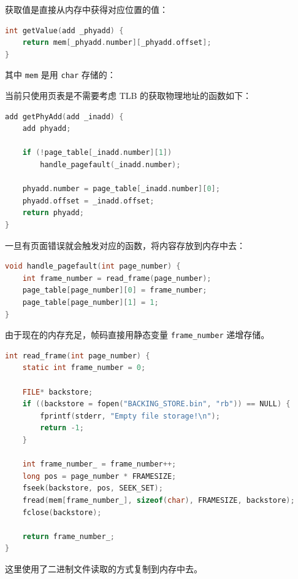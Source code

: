 \documentclass[12pt,a4paper]{article}
\newenvironment{problems}{\begin{list}{}{\renewcommand{\makelabel}[1]{\textbf{##1}\hfil}}}{\end{list}}
\providecommand{\code}[2]{}
\begin{document}
\begin{problems}
    获取值是直接从内存中获得对应位置的值：
    \begin{lstlisting}[language=c]
int getValue(add _phyadd) {
    return mem[_phyadd.number][_phyadd.offset];
}
    \end{lstlisting}

    其中 \verb"mem" 是用 \verb"char" 存储的：
    \code{src/memory.h}{c}

    当前只使用页表是不需要考虑 TLB 的获取物理地址的函数如下：
    \begin{lstlisting}[language=c]
add getPhyAdd(add _inadd) {
    add phyadd;

    if (!page_table[_inadd.number][1])
        handle_pagefault(_inadd.number);

    phyadd.number = page_table[_inadd.number][0];
    phyadd.offset = _inadd.offset;
    return phyadd;
}
    \end{lstlisting}

    一旦有页面错误就会触发对应的函数，将内容存放到内存中去：
    \begin{lstlisting}[language=c]
void handle_pagefault(int page_number) {
	int frame_number = read_frame(page_number);
	page_table[page_number][0] = frame_number;
	page_table[page_number][1] = 1;
}
    \end{lstlisting}

    由于现在的内存充足，帧码直接用静态变量 \verb"frame_number" 递增存储。
    \begin{lstlisting}[language=c]
int read_frame(int page_number) {
	static int frame_number = 0;

	FILE* backstore;
	if ((backstore = fopen("BACKING_STORE.bin", "rb")) == NULL) {
		fprintf(stderr, "Empty file storage!\n");
		return -1;
	}

	int frame_number_ = frame_number++;
	long pos = page_number * FRAMESIZE;
	fseek(backstore, pos, SEEK_SET);
	fread(mem[frame_number_], sizeof(char), FRAMESIZE, backstore);
	fclose(backstore);

	return frame_number_;
}
    \end{lstlisting}
    这里使用了二进制文件读取的方式复制到内存中去。
\end{problems}
\end{document}

